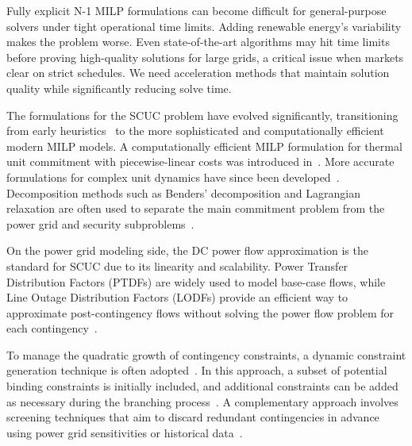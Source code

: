 \documentclass[runningheads]{llncs}
\begin{document}
Fully explicit N-1 MILP formulations can become difficult for general-purpose solvers under tight operational time limits. Adding renewable energy's variability makes the problem worse. Even state-of-the-art algorithms may hit time limits before proving high-quality solutions for large grids, a critical issue when markets clear on strict schedules. We need acceleration methods that maintain solution quality while significantly reducing solve time.

The formulations for the SCUC problem have evolved significantly, transitioning from early heuristics~\cite{Merlin1983} to the more sophisticated and computationally efficient modern MILP models. A computationally efficient MILP formulation for thermal unit commitment with piecewise-linear costs was introduced in~\cite{Carrion2006}. More accurate formulations for complex unit dynamics have since been developed~\cite{Ostrowski2012}. Decomposition methods such as Benders' decomposition and Lagrangian relaxation are often used to separate the main commitment problem from the power grid and security subproblems~\cite{Morales2013, Pan2016}.


On the power grid modeling side, the DC power flow approximation is the standard for SCUC due to its linearity and scalability. Power Transfer Distribution Factors (PTDFs) are widely used to model base-case flows, while Line Outage Distribution Factors (LODFs) provide an efficient way to approximate post-contingency flows without solving the power flow problem for each contingency~\cite{Christie2000, Tejada2018}.

To manage the quadratic growth of contingency constraints, a dynamic constraint generation technique is often adopted~\cite{Tejada2018}.
In this approach, a subset of potential binding constraints is initially included, and additional constraints can be added as necessary during the branching process~\cite{Tejada2018}. A complementary approach involves screening techniques that aim to discard redundant contingencies in advance using power grid sensitivities or historical data~\cite{Holzer2024}.
\end{document}
